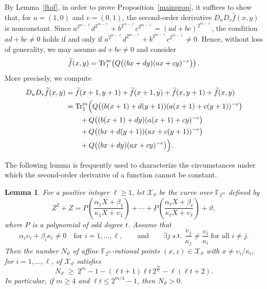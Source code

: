 \documentclass[12pt]{article}
\theoremstyle{plain}
\newtheorem{lemma}{Lemma}
\theoremstyle{definition}
\newcommand{\F}{\mathbb{F}}
\newcommand{\Tr}{{\rm Tr}}
\begin{document}
	By Lemma~\ref{ftof}, in order to prove Proposition~\ref{mainprop}, it suffices to show that,
	for $u=(1,0)$ and $v=(0,1)$, the second-order derivative $D_uD_v\widehat f(x,y)$
	is nonconstant.
	Since $a^{2^{m-\ell}} d^{2^{m-\ell}}
	+
	b^{2^{m-\ell}} c^{2^{m-\ell}}
	=
	(ad+bc)^{2^{m-\ell}}$,
	the condition $ad+bc \neq 0$ holds if and only if $a^{2^{m-\ell}} d^{2^{m-\ell}}
	+
	b^{2^{m-\ell}} c^{2^{m-\ell}}
	\neq 0$.
	Hence, without loss of generality, we may assume $ad+bc \neq 0$ and consider
	\[
	\widetilde{f}(x,y)
	=
	\Tr_1^m\!\left(
	Q\!\left(
	(bx+dy)(ax+cy)^{-e}
	\right)
	\right).
	\]
	More precisely, we compute
	\begin{align}
		D_uD_v\widetilde f(x,y)
		&=
		\widetilde f(x+1,y+1)
		+\widetilde f(x+1,y)
		+\widetilde f(x,y+1)
		+\widetilde f(x,y) \label{eq:Duv} \\
		&=
		\Tr_1^m\Big(
		Q\big((b(x+1)+d(y+1))(a(x+1)+c(y+1))^{-e}\big) \nonumber \\
		&\qquad
		+ Q\big((b(x+1)+dy)(a(x+1)+cy)^{-e}\big) \nonumber \\
		&\qquad
		+ Q\big((bx+d(y+1))(ax+c(y+1))^{-e}\big) \nonumber \\
		&\qquad
		+ Q\big((bx+dy)(ax+cy)^{-e}\big)
		\Big). \nonumber
	\end{align}
	
	The following lemma is frequently used to characterize the circumstances under which the second-order derivative of a function cannot be constant.
	
	\begin{lemma}\label{lem:curveDuv}
		For a positive integer $\ell \geq 1$, let $\mathcal{X}_\vartheta$ be the curve over $\F_{2^m}$ defined by
		\begin{equation} \label{eq:X_theta}
			Z^2+Z
			=
			P\!\left( \frac{\alpha_1 X+\beta_1}{\kappa_1 X+\upsilon_1} \right)
			+
			\cdots
			+
			P\!\left( \frac{\alpha_\ell X+\beta_\ell}{\kappa_\ell X+\upsilon_\ell} \right)
			+\vartheta ,
		\end{equation}
		where $P$ is a polynomial of odd degree $t$.
		Assume that
		\[
		\alpha_i\upsilon_i+\beta_i\kappa_i \neq 0
		\quad \text{for } i=1,\ldots, \ell,
		\qquad\text{and}\qquad
		\exists j \text{ s.t. }\frac{\upsilon_j}{\kappa_j} \neq \frac{\upsilon_i}{\kappa_i}
		\ \text{for all } i\neq j.
		\]
		Then the number $N_\vartheta$ of affine $\F_{2^m}$-rational points
		$(x,z)\in \mathcal{X}_\vartheta$ with  $x\neq \upsilon_i/\kappa_i$, for $i=1, \ldots, \ell$, of $\mathcal{X}_\vartheta$
		satisfies
		\[
		N_\vartheta
		\;\ge\;
		2^m - 1 - (\ell t+1)\ell t\,2^{\frac{m}{2}} - \ell (\ell t+2).
		\]
		In particular, if $m \ge 4$ and $\ell t \le 2^{m/4}-1$, then $N_\vartheta > 0$.
	\end{lemma}
	
\end{document}
